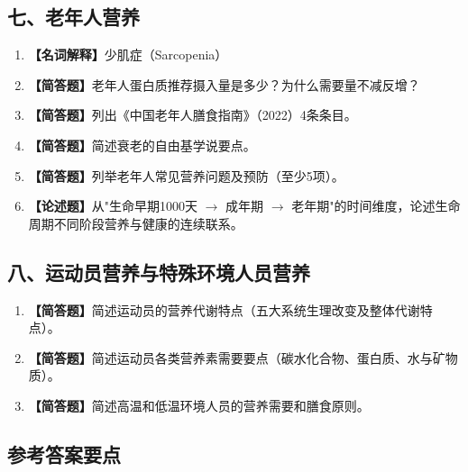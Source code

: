 {\subsection*{七、老年人营养}

\begin{enumerate}[leftmargin=*, itemsep=8pt, start=35]
    \item \textbf{【名词解释】}少肌症（Sarcopenia）
    \item \textbf{【简答题】}老年人蛋白质推荐摄入量是多少？为什么需要量不减反增？
    \item \textbf{【简答题】}列出《中国老年人膳食指南》（2022）4条条目。
    \item \textbf{【简答题】}简述衰老的自由基学说要点。
    \item \textbf{【简答题】}列举老年人常见营养问题及预防（至少5项）。
    \item \textbf{【论述题】}从"生命早期1000天 $\rightarrow$ 成年期 $\rightarrow$ 老年期"的时间维度，论述生命周期不同阶段营养与健康的连续联系。
\end{enumerate}

\subsection*{八、运动员营养与特殊环境人员营养}

\begin{enumerate}[leftmargin=*, itemsep=8pt, start=41]
    \item \textbf{【简答题】}简述运动员的营养代谢特点（五大系统生理改变及整体代谢特点）。
    \item \textbf{【简答题】}简述运动员各类营养素需要要点（碳水化合物、蛋白质、水与矿物质）。
    \item \textbf{【简答题】}简述高温和低温环境人员的营养需要和膳食原则。
\end{enumerate}

\subsection*{参考答案要点}

}
